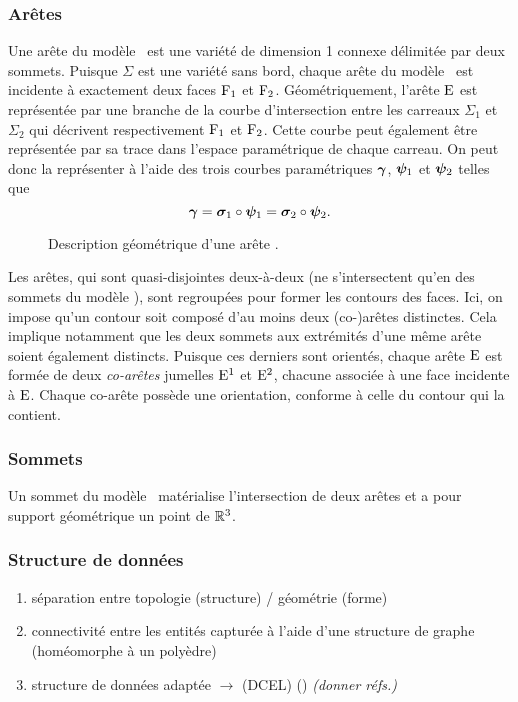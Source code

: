 \subsubsection{Arêtes}
\label{section:def_brep_edges}
Une arête du modèle \brep\ est une variété de dimension 1 connexe délimitée par deux sommets. 
Puisque $\Sigma$ est une variété sans bord, chaque arête du modèle \brep\ est incidente à exactement deux faces $\mathrm{F}_1$ et $\mathrm{F}_2$. 
Géométriquement, l'arête $\mathrm{E}$ est représentée par une branche de la courbe d'intersection entre les carreaux $\Sigma_1$ et $\Sigma_2$ qui décrivent respectivement $\mathrm{F}_1$ et $\mathrm{F}_2$. 
Cette courbe peut également être représentée par sa trace dans l'espace paramétrique de chaque carreau. 
On peut donc la représenter à l'aide des trois courbes paramétriques $\bm{\gamma}$, $\bm{\psi}_1$ et $\bm{\psi}_2$ telles que
\begin{equation}
	\bm{\gamma} = \bm{\sigma}_1 \circ \bm{\psi}_1 = \bm{\sigma}_2 \circ \bm{\psi}_2.
\end{equation}

\begin{figure}
	\centering
	
	\caption{Description géométrique d'une arête \brep.}
\end{figure}

Les arêtes, qui sont quasi-disjointes deux-à-deux (\ie ne s'intersectent qu'en des sommets du modèle \brep), sont regroupées pour former les contours des faces. 
Ici, on impose qu'un contour soit composé d'au moins deux (co-)arêtes distinctes.
Cela implique notamment que les deux sommets aux extrémités d'une même arête soient également distincts.
Puisque ces derniers sont orientés, chaque arête $\mathrm{E}$ est formée de deux \textit{co-arêtes} jumelles $\mathrm{E}^1$ et $\mathrm{E}^2$, chacune associée à une face incidente à $\mathrm{E}$. 
Chaque co-arête possède une orientation, conforme à celle du contour qui la contient.


\subsubsection{Sommets}
\label{section:def_brep_vertices}
Un sommet du modèle \brep\ matérialise l'intersection de deux arêtes et a pour support géométrique un point de $\mathbb{R}^3$.

\subsubsection{Structure de données}
\begin{enumerate}
	\item séparation entre topologie (structure) / géométrie (forme)
	\item connectivité entre les entités capturée à l'aide d'une structure de graphe (homéomorphe à un polyèdre)
	\item structure de données adaptée $\to$  (DCEL) () \textit{(donner réfs.)}
\end{enumerate}

